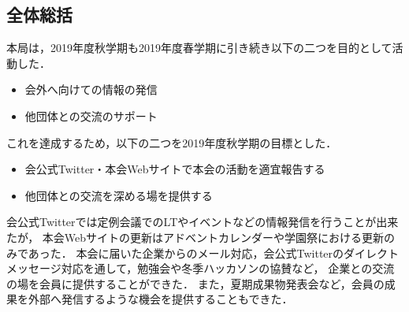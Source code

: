 \subsection*{全体総括}


本局は，2019年度秋学期も2019年度春学期に引き続き以下の二つを目的として活動した．
\begin{itemize}
	\item 会外へ向けての情報の発信
	\item 他団体との交流のサポート
\end{itemize}
これを達成するため，以下の二つを2019年度秋学期の目標とした．
\begin{itemize}
	\item 会公式Twitter・本会Webサイトで本会の活動を適宜報告する
	\item 他団体との交流を深める場を提供する
\end{itemize}

会公式Twitterでは定例会議でのLTやイベントなどの情報発信を行うことが出来たが，
本会Webサイトの更新はアドベントカレンダーや学園祭における更新のみであった．
本会に届いた企業からのメール対応，会公式Twitterのダイレクトメッセージ対応を通して，勉強会や冬季ハッカソンの協賛など，
企業との交流の場を会員に提供することができた．
また，夏期成果物発表会など，会員の成果を外部へ発信するような機会を提供することもできた．
